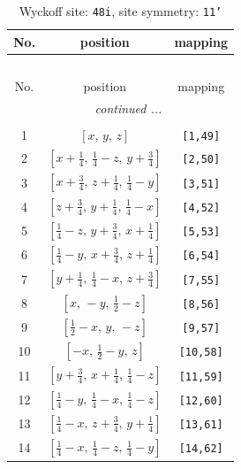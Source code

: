 \documentclass[fleqn,8pt]{jsarticle}
\begin{document}
\renewcommand{\arraystretch}{1.2}
\begin{longtable}{ccc}
\caption{Wyckoff site: {\tt 48i}, site symmetry: {\tt 11'}}
 \\
 \hline \hline
No. & position & mapping \\ \hline \endfirsthead

\multicolumn{2}{l}{\tablename\ \thetable{}} \\
 \hline \hline
No. & position & mapping \\ \hline \endhead

 \hline \hline
\multicolumn{2}{r}{\footnotesize\it continued ...} \\ \endfoot

 \hline \hline
\multicolumn{2}{r}{} \\ \endlastfoot

1 & $\left[ x,\, y,\, z \right]$ & {\tt [1,49]} \\ \hline
2 & $\left[ x + \frac{1}{4},\, \frac{1}{4} - z,\, y + \frac{3}{4} \right]$ & {\tt [2,50]} \\ \hline
3 & $\left[ x + \frac{3}{4},\, z + \frac{1}{4},\, \frac{1}{4} - y \right]$ & {\tt [3,51]} \\ \hline
4 & $\left[ z + \frac{3}{4},\, y + \frac{1}{4},\, \frac{1}{4} - x \right]$ & {\tt [4,52]} \\ \hline
5 & $\left[ \frac{1}{4} - z,\, y + \frac{3}{4},\, x + \frac{1}{4} \right]$ & {\tt [5,53]} \\ \hline
6 & $\left[ \frac{1}{4} - y,\, x + \frac{3}{4},\, z + \frac{1}{4} \right]$ & {\tt [6,54]} \\ \hline
7 & $\left[ y + \frac{1}{4},\, \frac{1}{4} - x,\, z + \frac{3}{4} \right]$ & {\tt [7,55]} \\ \hline
8 & $\left[ x,\, - y,\, \frac{1}{2} - z \right]$ & {\tt [8,56]} \\ \hline
9 & $\left[ \frac{1}{2} - x,\, y,\, - z \right]$ & {\tt [9,57]} \\ \hline
10 & $\left[ - x,\, \frac{1}{2} - y,\, z \right]$ & {\tt [10,58]} \\ \hline
11 & $\left[ y + \frac{3}{4},\, x + \frac{1}{4},\, \frac{1}{4} - z \right]$ & {\tt [11,59]} \\ \hline
12 & $\left[ \frac{1}{4} - y,\, \frac{1}{4} - x,\, \frac{1}{4} - z \right]$ & {\tt [12,60]} \\ \hline
13 & $\left[ \frac{1}{4} - x,\, z + \frac{3}{4},\, y + \frac{1}{4} \right]$ & {\tt [13,61]} \\ \hline
14 & $\left[ \frac{1}{4} - x,\, \frac{1}{4} - z,\, \frac{1}{4} - y \right]$ & {\tt [14,62]} \\ \hline

\end{longtable}
\end{document}
